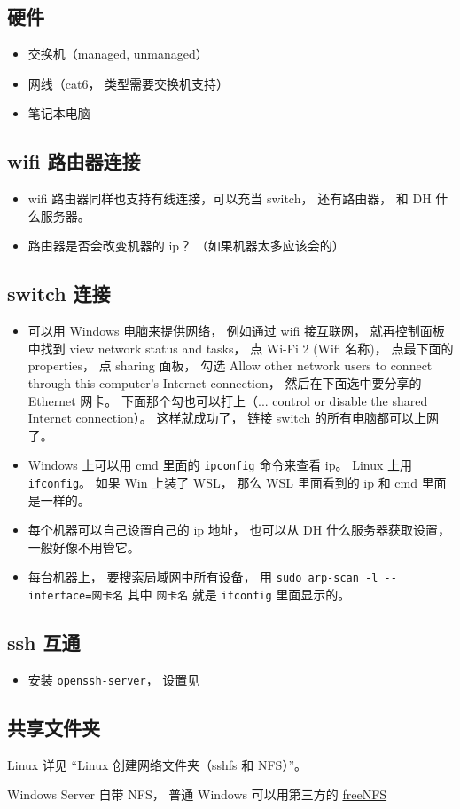 
\begin{issues}
\issueDraft
\end{issues}

\subsection{硬件}
\begin{itemize}
\item 交换机（managed, unmanaged）
\item 网线（cat6， 类型需要交换机支持）
\item 笔记本电脑
\end{itemize}

\subsection{wifi 路由器连接}
\begin{itemize}
\item wifi 路由器同样也支持有线连接，可以充当 switch， 还有路由器， 和 DH 什么服务器。
\item 路由器是否会改变机器的 ip？ （如果机器太多应该会的）
\end{itemize}

\subsection{switch 连接}
\begin{itemize}
\item 可以用 Windows 电脑来提供网络， 例如通过 wifi 接互联网， 就再控制面板中找到 view network status and tasks， 点 Wi-Fi 2 (Wifi 名称)， 点最下面的 properties， 点 sharing 面板， 勾选 Allow other network users to connect through this computer's Internet connection， 然后在下面选中要分享的 Ethernet 网卡。 下面那个勾也可以打上（... control or disable the shared Internet connection）。 这样就成功了， 链接 switch 的所有电脑都可以上网了。
\item Windows 上可以用 cmd 里面的 \verb|ipconfig| 命令来查看 ip。 Linux 上用 \verb|ifconfig|。 如果 Win 上装了 WSL， 那么 WSL 里面看到的 ip 和 cmd 里面是一样的。
\item 每个机器可以自己设置自己的 ip 地址， 也可以从 DH 什么服务器获取设置， 一般好像不用管它。
\item 每台机器上， 要搜索局域网中所有设备， 用 \verb|sudo arp-scan -l --interface=网卡名| 其中 \verb|网卡名| 就是 \verb|ifconfig| 里面显示的。
\end{itemize}

\subsection{ssh 互通}
\begin{itemize}
\item 安装 \verb|openssh-server|， 设置见
\end{itemize}

\subsection{共享文件夹}
Linux 详见 “Linux 创建网络文件夹（sshfs 和 NFS）”。

Windows Server 自带 NFS， 普通 Windows 可以用第三方的 \href{https://sourceforge.net/projects/freenfs/files/latest/download}{freeNFS}
